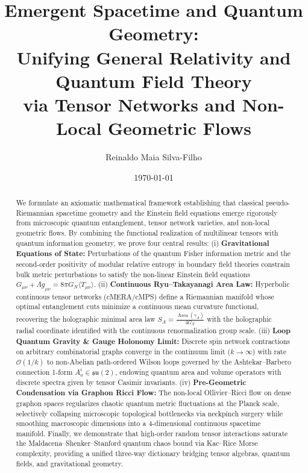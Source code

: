 \documentclass[11pt,a4paper,reqno]{amsart}
\title[Emergent Spacetime and Quantum Geometry]{Emergent Spacetime and Quantum Geometry:\\ Unifying General Relativity and Quantum Field Theory\\ via Tensor Networks and Non-Local Geometric Flows}
\author{Reinaldo Maia Silva-Filho}
\date{\today}
\theoremstyle{definition}
\numberwithin{equation}{section}
\providecommand{\Area}{\operatorname{Area}}
\begin{document}
\begin{abstract}
We formulate an axiomatic mathematical framework establishing that classical pseudo-Riemannian spacetime geometry and the Einstein field equations emerge rigorously from microscopic quantum entanglement, tensor network varieties, and non-local geometric flows. By combining the functional realization of multilinear tensors with quantum information geometry, we prove four central results:
(i) \textbf{Gravitational Equations of State:} Perturbations of the quantum Fisher information metric and the second-order positivity of modular relative entropy in boundary field theories constrain bulk metric perturbations to satisfy the non-linear Einstein field equations $G_{\mu\nu} + \Lambda g_{\mu\nu} = 8\pi G_N \langle T_{\mu\nu} \rangle$.
(ii) \textbf{Continuous Ryu--Takayanagi Area Law:} Hyperbolic continuous tensor networks (cMERA/cMPS) define a Riemannian manifold whose optimal entanglement cuts minimize a continuous mean curvature functional, recovering the holographic minimal area law $S_A = \frac{\Area(\gamma_A)}{4 G_N}$ with the holographic radial coordinate identified with the continuous renormalization group scale.
(iii) \textbf{Loop Quantum Gravity \& Gauge Holonomy Limit:} Discrete spin network contractions on arbitrary combinatorial graphs converge in the continuum limit ($k \to \infty$) with rate $\mathcal{O}(1/k)$ to non-Abelian path-ordered Wilson loops governed by the Ashtekar--Barbero connection 1-form $A_a^i \in \mathfrak{su}(2)$, endowing quantum area and volume operators with discrete spectra given by tensor Casimir invariants.
(iv) \textbf{Pre-Geometric Condensation via Graphon Ricci Flow:} The non-local Ollivier--Ricci flow on dense graphon spaces regularizes chaotic quantum metric fluctuations at the Planck scale, selectively collapsing microscopic topological bottlenecks via neckpinch surgery while smoothing macroscopic dimensions into a 4-dimensional continuous spacetime manifold.
Finally, we demonstrate that high-order random tensor interactions saturate the Maldacena--Shenker--Stanford quantum chaos bound via Kac--Rice Morse complexity, providing a unified three-way dictionary bridging tensor algebras, quantum fields, and gravitational geometry.
\end{abstract}

\maketitle

\tableofcontents
\newpage
\end{document}
